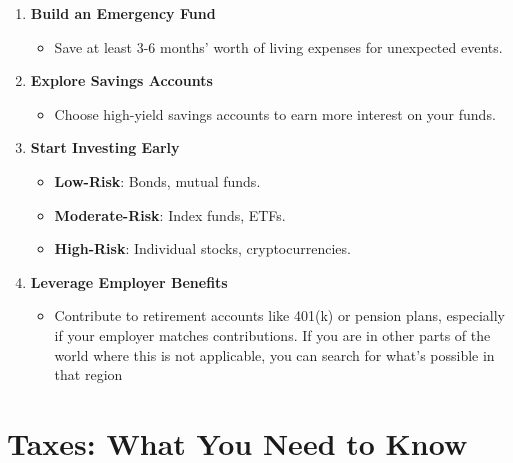 \documentclass[
  letterpaper,
  DIV=11,
  numbers=noendperiod]{scrreprt}
\providecommand{\tightlist}{%
  \setlength{\itemsep}{0pt}\setlength{\parskip}{0pt}}\usepackage{longtable,booktabs,array}
\begin{document}
\begin{enumerate}
\def\labelenumi{\arabic{enumi}.}
\item
  \textbf{Build an Emergency Fund}

  \begin{itemize}
  \tightlist
  \item
    Save at least 3-6 months' worth of living expenses for unexpected
    events.
  \end{itemize}
\item
  \textbf{Explore Savings Accounts}

  \begin{itemize}
  \tightlist
  \item
    Choose high-yield savings accounts to earn more interest on your
    funds.
  \end{itemize}
\item
  \textbf{Start Investing Early}

  \begin{itemize}
  \tightlist
  \item
    \textbf{Low-Risk}: Bonds, mutual funds.
  \item
    \textbf{Moderate-Risk}: Index funds, ETFs.
  \item
    \textbf{High-Risk}: Individual stocks, cryptocurrencies.
  \end{itemize}
\item
  \textbf{Leverage Employer Benefits}

  \begin{itemize}
  \tightlist
  \item
    Contribute to retirement accounts like 401(k) or pension plans,
    especially if your employer matches contributions. If you are in
    other parts of the world where this is not applicable, you can
    search for what's possible in that region
  \end{itemize}
\end{enumerate}

\section{Taxes: What You Need to
Know}\label{taxes-what-you-need-to-know}
\end{document}
